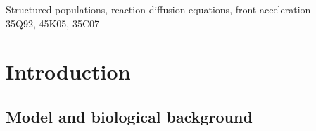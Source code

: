 \documentclass[11pt]{article}    %
\begin{document}
 {Structured populations, reaction-diffusion equations, front acceleration}\\
 {35Q92, 45K05, 35C07}

%
\section{Introduction}
\subsection{Model and biological background}
\end{document}
